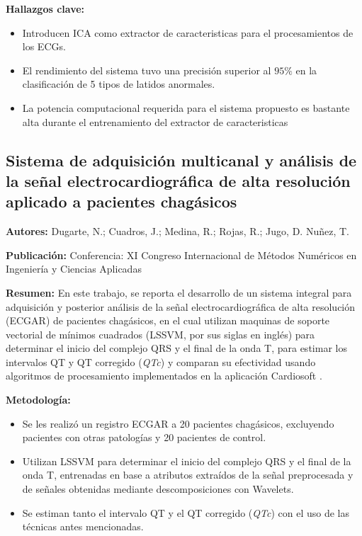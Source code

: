 \documentclass[12pt,letterpaper,oneside,openright]{book}
\begin{document}
\textbf{Hallazgos clave:} 
\begin{itemize}
	\item Introducen ICA como extractor de caracteristicas para el procesamientos de los ECGs.
	\item El rendimiento del sistema tuvo una precisión superior al $95\%$ en la clasificación de 5 tipos de latidos anormales.
	\item La potencia computacional requerida para el sistema propuesto es bastante alta durante el entrenamiento del extractor de caracteristicas
\end{itemize}

\subsection{Sistema de adquisición multicanal y análisis de la señal electrocardiográfica de alta resolución aplicado a pacientes chagásicos \cite{Dugarte11}}
\textbf{Autores:} Dugarte, N.; Cuadros, J.; Medina, R.; Rojas, R.; Jugo, D. Nuñez, T.

\textbf{Publicación:} Conferencia: XI Congreso Internacional de Métodos Numéricos en Ingeniería y Ciencias Aplicadas

\textbf{Resumen:} En este trabajo, se reporta el desarrollo de un sistema integral para adquisición y posterior análisis de la señal electrocardiográfica de alta resolución (ECGAR) de pacientes chagásicos, en el cual utilizan maquinas de soporte vectorial de mínimos cuadrados (LSSVM, por sus siglas en inglés) para determinar el inicio del complejo QRS y el final de la onda T, para estimar los intervalos QT y QT corregido (\textit{QTc}) y comparan su efectividad usando algoritmos de procesamiento implementados en la aplicación Cardiosoft \cite{cardiosoft}. 

\textbf{Metodología:}
\begin{itemize}
	\item Se les realizó un registro ECGAR a 20 pacientes chagásicos, excluyendo pacientes con otras patologías y 20 pacientes de control.
	\item Utilizan LSSVM para determinar el inicio del complejo QRS y el final de la onda T, entrenadas en base a atributos extraídos de la señal preprocesada y de señales obtenidas mediante descomposiciones con Wavelets.
	\item Se estiman tanto el intervalo QT y el QT corregido (\textit{QTc}) con el uso de las técnicas antes mencionadas.
\end{itemize}
\end{document}
